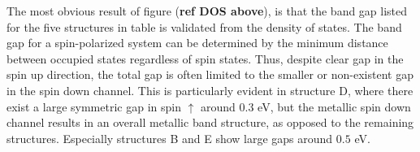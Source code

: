 \begin{comment}
\begin{table}[H]
\centering
\begin{tabular}{@{}cccc@{}}
\toprule
Structure  & Spin-up & Spin-down & Total  \\ \midrule
\textbf{A} & 0.0814  & 0.0522    & 0.0281 \\
\textbf{B} & 0.2932  & 0.0523    & 0.0523 \\
\textbf{C} & 0.2355  & 0.0343    & 0.0343 \\
\textbf{D} & 0.3386  & 0         & 0      \\
\textbf{E} & 0.3078  & 0.0495    & 0.0495 \\ \bottomrule
\end{tabular}
\caption{Band gap (GGA) in spin up and spin down channels of CFMNSi2 structures}
\end{table}

\begin{table}[H]
\centering
\begin{tabular}{@{}cccc@{}}
\toprule
Structure  & PBE    & SCAN   & HSE06  \\ \midrule
\textbf{A} & 0.0281 & 0.0000 & 0.0207 \\
\textbf{B} & 0.0523 & 0.0890 & 0.1808 \\
\textbf{C} & 0.0344 & 0.0690 & 0.0196 \\
\textbf{D} & 0.0000 & 0.0000 & 0.0000 \\
\textbf{E} & 0.0495 & 0.1048 & 0.0133 \\ \bottomrule
\end{tabular}
\caption{Band gap of $CFMN (FeSi_2)$ SQSs with GGA (PBE), meta-GGA (SCAN) and hybrid-functionals (HSE06). \textbf{Add footnote to explain the uncertainty in these results regarding smearing type and width, and DOS and EIGENVAL}}
\end{table}
\end{comment}

The most obvious result of figure (\textbf{ref DOS above}), is that the band gap listed for the five structures in table is validated from the density of states. The band gap for a spin-polarized system can be determined by the minimum distance between occupied states regardless of spin states. Thus, despite clear gap in the spin up direction, the total gap is often limited to the smaller or non-existent gap in the spin down channel. This is particularly evident in structure D, where there exist a large symmetric gap in spin $\uparrow$ around $0.3$ eV, but the metallic spin down channel results in an overall metallic band structure, as opposed to the remaining structures. Especially structures B and E show large gaps around $0.5$ eV. 

